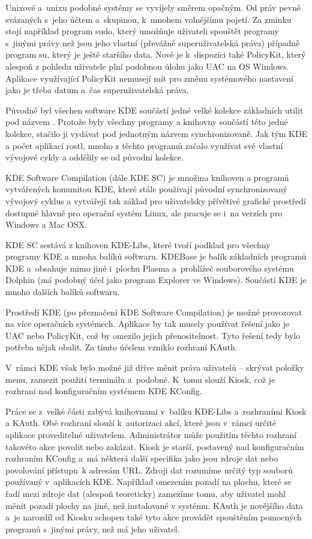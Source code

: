 Unixové a~unixu podobné systémy se vyvíjely směrem opačným. Od práv pevně svázaných s~jeho účtem a~skupinou, k~mnohem volnějšímu pojetí. Za zmínku stojí například program sudo, který umožňuje uživateli spouštět programy s~jinými právy než jsou jeho vlastní (převážně superuživatelská práva) případně program su, který je ještě staršího data. Nově je k~dispozici také PolicyKit, který alespoň z pohledu uživatele plní podobnou úlohu jako UAC na OS Windows. Aplikace využívající PolicyKit nemusejí mít pro změnu systémového nastavení jako je třeba datum a~čas superuživatelská práva.


Původně byl všechen software KDE součástí jedné velké kolekce základních utilit pod názvem . Protože byly všechny programy a knihovny součástí této jedné kolekce, stačilo ji vydávat pod jednotným názvem synchronizovaně. Jak tým KDE a počet aplikací rostl, mnoho z těchto programů začalo využívat své vlastní vývojové cykly a oddělily se od původní kolekce.

KDE Software Compilation (dále KDE SC) je množina knihoven a programů vytvářených komunitou KDE, které stále používají původní synchronizovaný vývojový cyklus a vytvářejí tak základ pro uživatelsky přívětivé grafické prostředí dostupné hlavně pro operační systém Linux, ale pracuje se i~na verzích pro Windows a Mac OSX.

KDE SC sestává z knihoven KDE-Libs, které tvoří podklad pro všechny programy KDE a mnoha balíků softwaru. KDEBase je balík základních programů KDE a~obsahuje mimo jiné i~plochu Plasma a~prohlížeč souborového systému Dolphin (má podobný účel jako program Explorer ve Windows). Součástí KDE je mnoho dalších balíků softwaru.

Prostředí KDE (po přeznačení KDE Software Compilation) je možné provozovat na více operačních systémech. Aplikace by tak musely používat řešení jako je UAC nebo PolicyKit, což by omezilo jejich přenositelnost. Tyto řešení tedy bylo potřeba nějak obalit. Za tímto účelem vzniklo rozhraní KAuth.\cite{whatiskde}


V~rámci KDE však bylo možné již dříve měnit práva uživatelů -- skrývat položky menu, zamezit použití terminálu a~podobně. K~tomu slouží Kiosk, což je rozhraní nad konfiguračním systémem KDE KConfig.

Práce se z~velké části zabývá knihovnami v~balíku KDE-Libs a~rozhraními Kiosk a KAuth. Obě rozhraní slouží k~autorizaci akcí, které jsou v~rámci určité aplikace proveditelné uživatelem. Administrátor může použitím těchto rozhraní takovéto akce povolit nebo zakázat. Kiosk je starší, postavený nad konfiguračním rozhraním KConfig a~má některá další specifika jako jsou zdroje dat nebo povolování přístupu~k adresám URL. Zdroji dat rozumíme určitý typ souborů používaný v~aplikacích KDE. Například omezením pozadí na plochu, které se řadí mezi zdroje dat (alespoň teoreticky) zamezíme tomu, aby uživatel mohl měnit pozadí plochy na jiné, než instalované v systému. KAuth je novějšího data a~je narozdíl od Kiosku schopen také tyto akce provádět spouštěním pomocných programů s~jinými právy, než má jeho uživatel.

